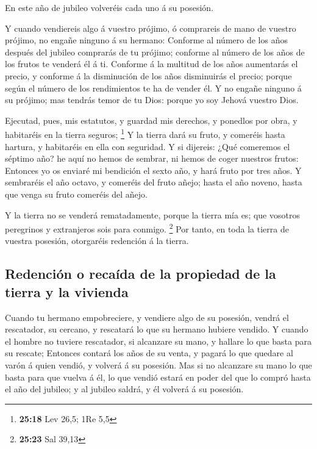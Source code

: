  En este año de jubileo volveréis cada uno á su posesión.

 Y cuando vendiereis algo á vuestro prójimo, ó comprareis
de mano de vuestro prójimo, no engañe ninguno á su hermano:
 Conforme al número de los años después del jubileo
comprarás de tu prójimo; conforme al número de los años de los frutos te
venderá él á ti.  Conforme á la multitud de los años
aumentarás el precio, y conforme á la disminución de los años
disminuirás el precio; porque según el número de los rendimientos te ha
de vender él.  Y no engañe ninguno á su prójimo; mas
tendrás temor de tu Dios: porque yo soy Jehová vuestro Dios.

 Ejecutad, pues, mis estatutos, y guardad mis derechos, y
ponedlos por obra, y habitaréis en la tierra seguros; \footnote{\textbf{25:18}
  Lev 26,5; 1Re 5,5}  Y la tierra dará su fruto, y
comeréis hasta hartura, y habitaréis en ella con seguridad.
 Y si dijereis: ¿Qué comeremos el séptimo año? he aquí no
hemos de sembrar, ni hemos de coger nuestros frutos: 
Entonces yo os enviaré mi bendición el sexto año, y hará fruto por tres
años.  Y sembraréis el año octavo, y comeréis del fruto
añejo; hasta el año noveno, hasta que venga su fruto comeréis del añejo.

 Y la tierra no se venderá rematadamente, porque la
tierra mía es; que vosotros peregrinos y extranjeros sois para conmigo.
\footnote{\textbf{25:23} Sal 39,13}  Por tanto, en toda
la tierra de vuestra posesión, otorgaréis redención á la tierra.

\hypertarget{redenciuxf3n-o-recauxedda-de-la-propiedad-de-la-tierra-y-la-vivienda}{%
\subsection{Redención o recaída de la propiedad de la tierra y la
vivienda}\label{redenciuxf3n-o-recauxedda-de-la-propiedad-de-la-tierra-y-la-vivienda}}

 Cuando tu hermano empobreciere, y vendiere algo de su
posesión, vendrá el rescatador, su cercano, y rescatará lo que su
hermano hubiere vendido.  Y cuando el hombre no tuviere
rescatador, si alcanzare su mano, y hallare lo que basta para su
rescate;  Entonces contará los años de su venta, y pagará
lo que quedare al varón á quien vendió, y volverá á su posesión.
 Mas si no alcanzare su mano lo que basta para que vuelva
á él, lo que vendió estará en poder del que lo compró hasta el año del
jubileo; y al jubileo saldrá, y él volverá á su posesión.

